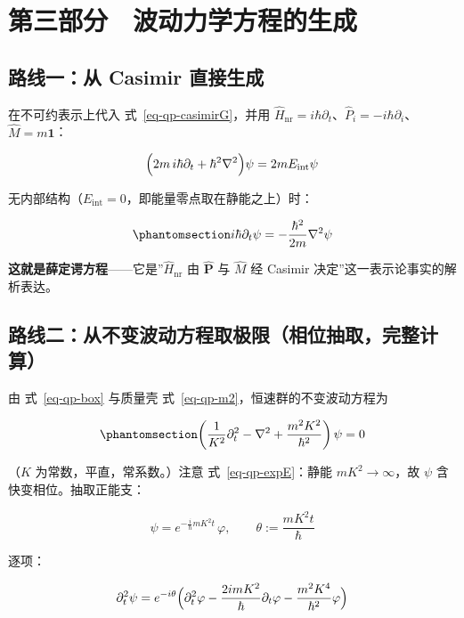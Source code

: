 \documentclass[
  chinese,
  a4paper,
  UTF8,
  12pt,
  oneside,
  openany]{ctexbook}
\theoremstyle{plain}
\theoremstyle{plain}
\theoremstyle{plain}
\theoremstyle{definition}
\theoremstyle{plain}
\theoremstyle{plain}
\theoremstyle{remark}
\begin{document}
\section{第三部分　波动力学方程的生成}\label{sec-qp-part3}

\subsection{路线一：从 Casimir
直接生成}\label{ux8defux7ebfux4e00ux4ece-casimir-ux76f4ux63a5ux751fux6210}

在不可约表示上代入 式~\ref{eq-qp-casimirG}，并用
\(\hat H_{\text{nr}}=i\hbar\partial_t\)、\(\hat P_i=-i\hbar\partial_i\)、\(\hat M=m\mathbf 1\)：

\[
\Bigl(2m\,i\hbar\partial_t+\hbar^{2}\nabla^{2}\Bigr)\psi=2mE_{\text{int}}\psi
\]

无内部结构（\(E_{\text{int}}=0\)，即能量零点取在静能之上）时：

\begin{equation}\protect\phantomsection\label{eq-qp-schrodinger}{
i\hbar\partial_t\psi=-\frac{\hbar^{2}}{2m}\nabla^{2}\psi
}\end{equation}

\textbf{这就是薛定谔方程}------它是''\(\hat H_{\text{nr}}\) 由
\(\hat{\mathbf P}\) 与 \(\hat M\) 经 Casimir
决定''这一表示论事实的解析表达。

\subsection{路线二：从不变波动方程取极限（相位抽取，完整计算）}\label{ux8defux7ebfux4e8cux4eceux4e0dux53d8ux6ce2ux52a8ux65b9ux7a0bux53d6ux6781ux9650ux76f8ux4f4dux62bdux53d6ux5b8cux6574ux8ba1ux7b97}

由 式~\ref{eq-qp-box} 与质量壳 式~\ref{eq-qp-m2}，恒速群的不变波动方程为

\begin{equation}\protect\phantomsection\label{eq-qp-KG}{
\left(\frac{1}{K^{2}}\partial_t^{2}-\nabla^{2}+\frac{m^{2}K^{2}}{\hbar^{2}}\right)\psi=0
}\end{equation}

（\(K\) 为常数，平直，常系数。）注意 式~\ref{eq-qp-expE}：静能
\(mK^{2}\to\infty\)，故 \(\psi\) 含快变相位。抽取正能支：

\[
\psi=e^{-\frac{i}{\hbar}mK^{2}t}\,\varphi,\qquad
\theta:=\frac{mK^{2}t}{\hbar}
\]

逐项：

\[
\partial_t^{2}\psi=e^{-i\theta}\Bigl(\partial_t^{2}\varphi-\frac{2imK^{2}}{\hbar}\partial_t\varphi-\frac{m^{2}K^{4}}{\hbar^{2}}\varphi\Bigr)
\]
\end{document}
